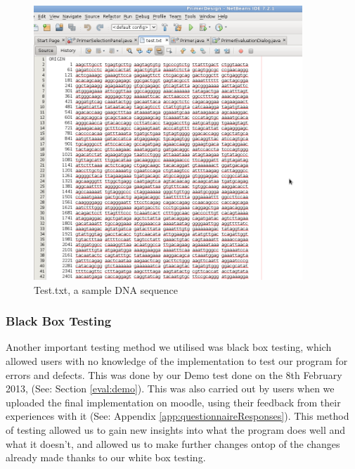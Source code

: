 \begin{figure}[h]
  \begin{center}
   \includegraphics[width=0.9\textwidth]{./images/demoBuild/test.png}
   \caption{
     \label{fig:demoBuild:test}
     Test.txt, a sample DNA sequence
    }
\end{center}
\end{figure}

\subsubsection{Black Box Testing}

Another important testing method we utilised was black box testing,
which allowed users with no knowledge of the implementation to test
our program for errors and defects.
This was done by our Demo test done on the 8th February 2013, (See:
Section \ref{eval:demo}).
This was also carried out by users when we uploaded the final
implementation on moodle, using their feedback from their experiences
with it (See: Appendix \ref{app:questionnaireResponses}).
This method of testing allowed us to gain new insights into what the
program does well and what it doesn't, and allowed us to make further
changes ontop of the changes already made thanks to our white box
testing.

\newpage




